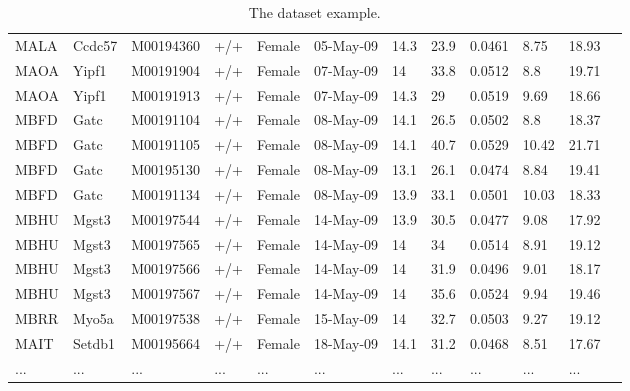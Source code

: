 \documentclass[12pt,a4paper]{article}
\begin{document}
\begin{table}
\begin{tabular}{| p{13mm} | p{13mm} | l | l | l | p{19mm}| p{12mm} | l | p{13mm} | p{12mm} | p{12mm} | l |}
MALA&Ccdc57&M00194360&+/+&Female&05-May-09&14.3&23.9&0.0461&8.75&18.93&\\
MAOA&Yipf1&M00191904&+/+&Female&07-May-09&14&33.8&0.0512&8.8&19.71&\\
MAOA&Yipf1&M00191913&+/+&Female&07-May-09&14.3&29&0.0519&9.69&18.66&\\
MBFD&Gatc&M00191104&+/+&Female&08-May-09&14.1&26.5&0.0502&8.8&18.37&\\
MBFD&Gatc&M00191105&+/+&Female&08-May-09&14.1&40.7&0.0529&10.42&21.71&\\
MBFD&Gatc&M00195130&+/+&Female&08-May-09&13.1&26.1&0.0474&8.84&19.41&\\
MBFD&Gatc&M00191134&+/+&Female&08-May-09&13.9&33.1&0.0501&10.03&18.33&\\
MBHU&Mgst3&M00197544&+/+&Female&14-May-09&13.9&30.5&0.0477&9.08&17.92&\\
MBHU&Mgst3&M00197565&+/+&Female&14-May-09&14&34&0.0514&8.91&19.12&\\
MBHU&Mgst3&M00197566&+/+&Female&14-May-09&14&31.9&0.0496&9.01&18.17&\\
MBHU&Mgst3&M00197567&+/+&Female&14-May-09&14&35.6&0.0524&9.94&19.46&\\
MBRR&Myo5a&M00197538&+/+&Female&15-May-09&14&32.7&0.0503&9.27&19.12&\\
MAIT&Setdb1&M00195664&+/+&Female&18-May-09&14.1&31.2&0.0468&8.51&17.67&\\
...&...&...&...&...&...&...&...&...&...&...&\\
\hline  
\end{tabular}
\caption{The dataset example.}\label{table:01}
\end{table}
\end{document}
